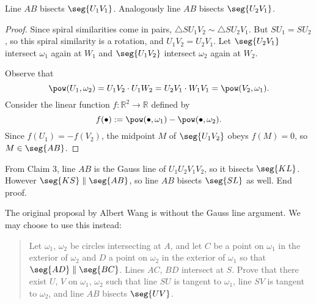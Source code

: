 \begin{claim}
    Line $AB$ bisects $\seg{U_1V_1}$. Analogously line $AB$ bisects $\seg{U_2V_1}$.
\end{claim}
\begin{proof}
Since spiral similarities come in pairs, $\triangle SU_1V_2\sim\triangle SU_2V_1$. But $SU_1=SU_2$, so this spiral similarity is a rotation, and $U_1V_2=U_2V_1$. Let $\seg{U_2V_1}$ intersect $\omega_1$ again at $W_1$ and $\seg{U_1V_2}$ intersect $\omega_2$ again at $W_2$.

Observe that \[\pow(U_1,\omega_2)=U_1V_2\cdot U_1W_2=U_2V_1\cdot W_1V_1=\pow(V_2,\omega_1).\]
Consider the linear function $f:\mathbb R^2\to\mathbb R$ defined by \[f(\bullet):=\pow(\bullet,\omega_1)-\pow(\bullet,\omega_2).\]
Since $f(U_1)=-f(V_2)$, the midpoint $M$ of $\seg{U_1V_2}$ obeys $f(M)=0$, so $M\in\seg{AB}$.
\end{proof}

From Claim 3, line $AB$ is the Gauss line of $U_1U_2V_1V_2$, so it bisects $\seg{KL}$. However $\seg{KS}\parallel\seg{AB}$, so line $AB$ bisects $\seg{SL}$ as well. End proof.
\begin{remark}
    The original proposal by Albert Wang is without the Gauss line argument. We may choose to use this instead:
    \begin{quote}
    Let $\omega_1$, $\omega_2$ be circles intersecting at $A$, and let $C$ be a point on $\omega_1$ in the exterior of $\omega_2$ and $D$ a point on $\omega_2$ in the exterior of $\omega_1$ so that $\seg{AD}\parallel\seg{BC}$. Lines $AC$, $BD$ intersect at $S$. Prove that there exist $U$, $V$ on $\omega_1$, $\omega_2$ such that line $SU$ is tangent to $\omega_1$, line $SV$ is tangent to $\omega_2$, and line $AB$ bisects $\seg{UV}$.
    \end{quote}
\end{remark}

